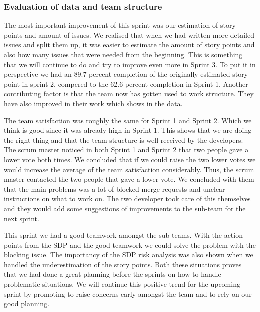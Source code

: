 \documentclass{article}
\begin{document}
\subsubsection{Evaluation of data and team structure}
The most important improvement of this sprint was our estimation of story points and amount of issues. We realised that when we had written more detailed issues and split them up, it was easier to estimate the amount of story points and also how many issues that were needed from the beginning. This is something that we will continue to do and try to improve even more in Sprint 3. To put it in perspective we had an 89.7 percent completion of the originally estimated story point in sprint 2, compered to the 62.6 percent completion in Sprint 1. Another contributing factor is that the team now has gotten used to work structure. They have also improved in their work which shows in the data. 

The team satisfaction was roughly the same for Sprint 1 and Sprint 2. Which we think is good since it was already high in Sprint 1. This shows that we are doing the right thing and that the team structure is well received by the developers. The scrum master noticed in both Sprint 1 and Sprint 2 that two people gave a lower vote both times. We concluded that if we could raise the two lower votes we would increase the average of the team satisfaction considerably. Thus, the scrum master contacted the two people that gave a lower vote.  We concluded with them that the main problems was a lot of blocked merge requests and unclear instructions on what to work on. The two developer took care of this themselves and they would add some suggestions of improvements to the sub-team for the next sprint.

This sprint we had a good teamwork amongst the sub-teams. With the action points from the SDP and the good teamwork we could solve the problem with the blocking issue. The importancy of the SDP risk analysis was also shown when we handled the underestimation of the story points. Both these situations proves that we had done a great planning before the sprints on how to handle problematic situations. We will continue this positive trend for the upcoming sprint by promoting to raise concerns early amongst the team and to rely on our good planning.
\end{document}
